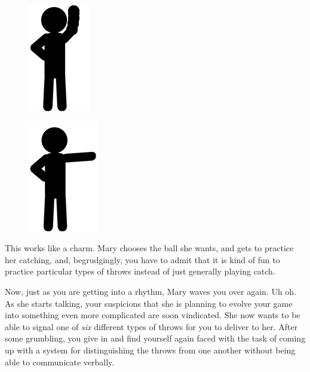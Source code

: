 \documentclass[UTF8]{book}
\begin{document}
\begin{CJK}{UTF8}{gbsn}
\begin{figure}[H]
\centering
\captionsetup{labelformat=empty}
\begin{minipage}{.4\textwidth}
  \centering
  \includegraphics[width=.3\linewidth]{stick-figure-arm-raised}
  \label{fig:test1}
\end{minipage}%
\begin{minipage}{.4\textwidth}
  \centering
  \includegraphics[width=.3\linewidth]{stick-figure-arm-sideways}
  \label{fig:test2}
\end{minipage}
\end{figure}

This works like a charm. Mary chooses the ball she wants, and gets to practice her catching, and, begrudgingly, you have to admit that it is kind of fun to practice particular types of throws instead of just generally playing catch.

Now, just as you are getting into a rhythm, Mary waves you over again. Uh oh. As she starts talking, your suspicions that she is planning to evolve your game into something even more complicated are soon vindicated. She now wants to be able to signal one of \emph{six} different types of throws for you to deliver to her. After some grumbling, you give in and find yourself again faced with the task of coming up with a system for distinguishing the throws from one another without being able to communicate verbally.


\end{CJK}
\end{document}

